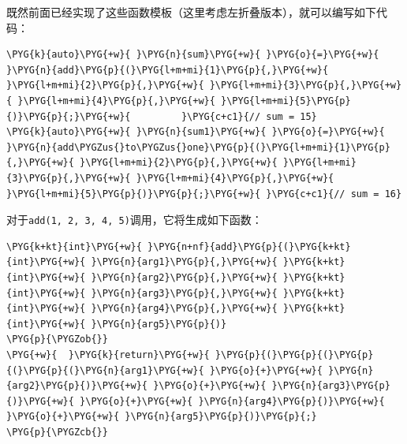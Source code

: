 
既然前面已经实现了这些函数模板（这里考虑左折叠版本），就可以编写如下代码：



\begin{codeblockbg}
\begin{Verbatim}[commandchars=\\\{\},breaklines=true,breakanywhere=true,fontsize=\codefont,xleftmargin=17bp]
\PYG{k}{auto}\PYG{+w}{ }\PYG{n}{sum}\PYG{+w}{ }\PYG{o}{=}\PYG{+w}{ }\PYG{n}{add}\PYG{p}{(}\PYG{l+m+mi}{1}\PYG{p}{,}\PYG{+w}{ }\PYG{l+m+mi}{2}\PYG{p}{,}\PYG{+w}{ }\PYG{l+m+mi}{3}\PYG{p}{,}\PYG{+w}{ }\PYG{l+m+mi}{4}\PYG{p}{,}\PYG{+w}{ }\PYG{l+m+mi}{5}\PYG{p}{)}\PYG{p}{;}\PYG{+w}{         }\PYG{c+c1}{// sum = 15}
\PYG{k}{auto}\PYG{+w}{ }\PYG{n}{sum1}\PYG{+w}{ }\PYG{o}{=}\PYG{+w}{ }\PYG{n}{add\PYGZus{}to\PYGZus{}one}\PYG{p}{(}\PYG{l+m+mi}{1}\PYG{p}{,}\PYG{+w}{ }\PYG{l+m+mi}{2}\PYG{p}{,}\PYG{+w}{ }\PYG{l+m+mi}{3}\PYG{p}{,}\PYG{+w}{ }\PYG{l+m+mi}{4}\PYG{p}{,}\PYG{+w}{ }\PYG{l+m+mi}{5}\PYG{p}{)}\PYG{p}{;}\PYG{+w}{ }\PYG{c+c1}{// sum = 16}
\end{Verbatim}
\end{codeblockbg}



对于\texttt{add(\allowbreak{}1, 2, 3, 4, 5)}调用，它将生成如下函数：



\begin{codeblockbg}
\begin{Verbatim}[commandchars=\\\{\},breaklines=true,breakanywhere=true,fontsize=\codefont,xleftmargin=17bp]
\PYG{k+kt}{int}\PYG{+w}{ }\PYG{n+nf}{add}\PYG{p}{(}\PYG{k+kt}{int}\PYG{+w}{ }\PYG{n}{arg1}\PYG{p}{,}\PYG{+w}{ }\PYG{k+kt}{int}\PYG{+w}{ }\PYG{n}{arg2}\PYG{p}{,}\PYG{+w}{ }\PYG{k+kt}{int}\PYG{+w}{ }\PYG{n}{arg3}\PYG{p}{,}\PYG{+w}{ }\PYG{k+kt}{int}\PYG{+w}{ }\PYG{n}{arg4}\PYG{p}{,}\PYG{+w}{ }\PYG{k+kt}{int}\PYG{+w}{ }\PYG{n}{arg5}\PYG{p}{)}
\PYG{p}{\PYGZob{}}
\PYG{+w}{  }\PYG{k}{return}\PYG{+w}{ }\PYG{p}{(}\PYG{p}{(}\PYG{p}{(}\PYG{p}{(}\PYG{n}{arg1}\PYG{+w}{ }\PYG{o}{+}\PYG{+w}{ }\PYG{n}{arg2}\PYG{p}{)}\PYG{+w}{ }\PYG{o}{+}\PYG{+w}{ }\PYG{n}{arg3}\PYG{p}{)}\PYG{+w}{ }\PYG{o}{+}\PYG{+w}{ }\PYG{n}{arg4}\PYG{p}{)}\PYG{+w}{ }\PYG{o}{+}\PYG{+w}{ }\PYG{n}{arg5}\PYG{p}{)}\PYG{p}{;}
\PYG{p}{\PYGZcb{}}
\end{Verbatim}
\end{codeblockbg}



